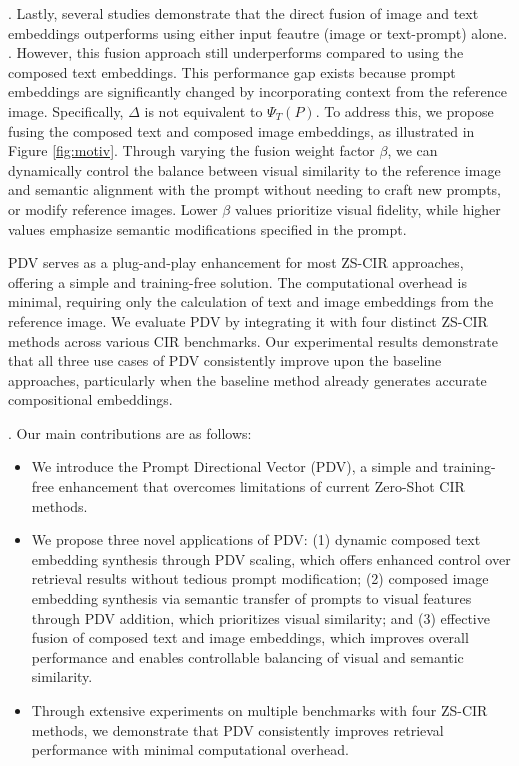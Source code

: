 . 
Lastly, several studies demonstrate that the direct fusion of image and text embeddings outperforms using either input feautre (image or text-prompt) alone. \cite{saito2023pic2word,karthik2024visionbylanguage,baldrati2023zero}. However, this fusion approach still underperforms compared to using the composed text embeddings. This performance gap exists because prompt embeddings are significantly changed by incorporating context from the reference image. Specifically, $\Delta$ is not equivalent to $\Psi_{T}(P)$. To address this, we propose fusing the composed text and composed image embeddings, as illustrated in Figure \ref{fig:motiv}. Through varying the fusion weight factor $\beta$, we can dynamically control the balance between visual similarity to the reference image and semantic alignment with the prompt without needing to craft new prompts, or modify reference images. Lower $\beta$ values prioritize visual fidelity, while higher values emphasize semantic modifications specified in the prompt.


PDV serves as a plug-and-play enhancement for most ZS-CIR approaches, offering a simple and training-free solution. The computational overhead is minimal, requiring only the calculation of text and image embeddings from the reference image. We evaluate PDV by integrating it with four distinct ZS-CIR methods across various CIR benchmarks. Our experimental results demonstrate that all three use cases of PDV consistently improve upon the baseline approaches, particularly when the baseline method already generates accurate compositional embeddings.

. Our main contributions are as follows:
\begin{itemize}
   \item We introduce the Prompt Directional Vector (PDV), a simple and training-free enhancement that overcomes limitations of current Zero-Shot CIR methods.
   
   \item We propose three novel applications of PDV: (1) dynamic composed text embedding synthesis through PDV scaling, which offers enhanced control over retrieval results without tedious prompt modification; (2) composed image embedding synthesis via semantic transfer of prompts to visual features through PDV addition, which prioritizes visual similarity; and (3) effective fusion of composed text and image embeddings, which improves overall performance and enables controllable balancing of visual and semantic similarity.
   
   \item Through extensive experiments on multiple benchmarks with four ZS-CIR methods, we demonstrate that PDV consistently improves retrieval performance with minimal computational overhead.
\end{itemize}

